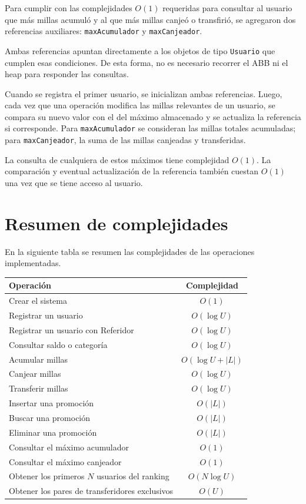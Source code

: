 \documentclass[12pt,a4paper]{article}
\begin{document}
Para cumplir con las complejidades $O(1)$ requeridas para consultar al usuario que más millas acumuló y al que más millas canjeó o transfirió, se agregaron dos referencias auxiliares: \texttt{maxAcumulador} y \texttt{maxCanjeador}.

Ambas referencias apuntan directamente a los objetos de tipo \texttt{Usuario} que cumplen esas condiciones. De esta forma, no es necesario recorrer el ABB ni el heap para responder las consultas.

Cuando se registra el primer usuario, se inicializan ambas referencias. Luego, cada vez que una operación modifica las millas relevantes de un usuario, se compara su nuevo valor con el del máximo almacenado y se actualiza la referencia si corresponde. Para \texttt{maxAcumulador} se consideran las millas totales acumuladas; para \texttt{maxCanjeador}, la suma de las millas canjeadas y transferidas.

La consulta de cualquiera de estos máximos tiene complejidad $O(1)$. La comparación y eventual actualización de la referencia también cuestan $O(1)$ una vez que se tiene acceso al usuario.

\section{Resumen de complejidades}

En la siguiente tabla se resumen las complejidades de las operaciones implementadas.

\begin{center}
\begin{tabular}{|l|c|}
\hline
\textbf{Operación} & \textbf{Complejidad} \\
\hline
Crear el sistema & $O(1)$ \\
Registrar un usuario & $O(\log U)$ \\
Registrar un usuario con Referidor & $O(\log U)$ \\
Consultar saldo o categoría & $O(\log U)$ \\
Acumular millas & $O(\log U + |L|)$ \\
Canjear millas & $O(\log U)$ \\
Transferir millas & $O(\log U)$ \\
Insertar una promoción & $O(|L|)$ \\
Buscar una promoción & $O(|L|)$ \\
Eliminar una promoción & $O(|L|)$ \\
Consultar el máximo acumulador & $O(1)$ \\
Consultar el máximo canjeador & $O(1)$ \\
Obtener los primeros $N$ usuarios del ranking & $O(N\log U)$ \\
Obtener los pares de transferidores exclusivos & $O(U)$ \\
\hline
\end{tabular}
\end{center}
\end{document}
